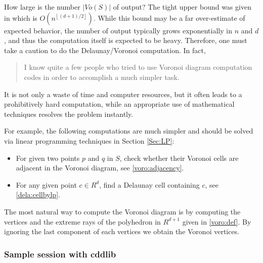 \documentclass[[a4paper,12pt]{article}
\begin{document}
How large is the number $|Vo(S)|$ of output?  The tight upper bound
was given in \cite{s-eubnf-91} which is 
$O(n^{\left\lfloor (d+1)/2 \right\rfloor})$.
While this bound may be a far over-estimate of expected behavior,
the number of output typically grows exponentially 
in $n$ and $d$, and thus the computation itself
is expected to be heavy.  Therefore, one must take a caution to do
the Delaunay/Voronoi computation.  In fact,
\begin{quote} I know quite a few people who tried to
use Voronoi diagram computation codes in order to accomplish
a much simpler task.
\end{quote}
It is not only a waste of time and computer resources, but
it often leads to a prohibitively hard computation, while
an appropriate use of mathematical techniques resolves
the problem instantly.

For example, the following computations are much simpler
and should be solved via linear programming techniques in Section \ref{Sec:LP}:
\begin{itemize}
\item For given two points $p$ and $q$ in $S$, check whether
their Voronoi cells are adjacent in the Voronoi diagram, see \ref{voro:adjacency}.
\item For any given point $c\in R^d$, find a Delaunay cell
containing $c$, see \ref{dela:cellbylp}.

\end{itemize}

The most natural way to compute the Voronoi diagram is by
computing the vertices and the extreme rays
of the polyhedron in $R^{d+1}$ given
in \ref{voro:def}.  By ignoring the last component
of each vertices we obtain the Voronoi vertices.

\subsubsection{Sample session with cddlib} 
\label{voro:computation:session}
\end{document}

